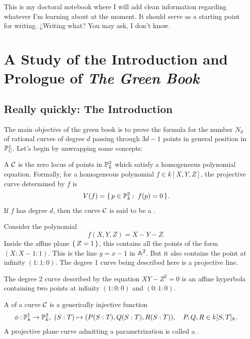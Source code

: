 \documentclass[12pt]{memoir}
\author{\nauthor}
\begin{document}
{\small 
\setlength{\parindent}{0em}
\setlength{\parskip}{1em}

This is my doctoral notebook where I will add clean information regarding whatever I'm learning about at the moment. It should serve as a starting point for writing. ¿Writing what? You may ask, I don't know.
}
\newpage
\tableofcontents
\chapter{A Study of the Introduction and Prologue of \emph{The Green Book}}

\section{Really quickly: The Introduction}

The main objective of the green book is to prove the formula for the number $N_d$ of rational curves of degree $d$ passing through $3d-1$ points in general position in $\mathbb{P}_{\mathbb{C}}^1$. Let's begin by unwrapping some concepts:

\begin{Def}
A  $\mathcal{C}$ is the zero locus of points in $\mathbb{P}^2_k$ which satisfy a homogeneous polynomial equation. Formally, for a homogeneous polynomial $f\in k[X,Y,Z]$, the projective curve determined by $f$ is
$$V(f)=\set{p\in\bP^2_k\:\ f(p)=0}.$$
If $f$ has degree $d$, then the curve $\mathcal{C}$ is said to be a .
\end{Def}

\begin{Ex}
Consider the polynomial 
$$f(X,Y,Z)=X-Y-Z.$$
Inside the affine plane $\{\,Z=1\,\}$, this contains all the points of the form $(X:X-1:1)$. This is the line $y=x-1$ in $\mathbb{A}^2$. But it also contains the point at infinity $(1:1:0)$. The degree 1 curve being described here is a projective line.
\end{Ex}

\begin{Ex}
    The degree 2 curve described by the equation $XY-Z^2=0$ is an affine hyperbola containing two points at infinity $(1:0:0)$ and $(0:1:0)$. 
\end{Ex}

\begin{Def}
A  of a curve $\mathcal{C}$ is a generically injective function $$\phi\:\bP^1_k\to\bP^2_k,\ (S:T)\mapsto(P(S:T),Q(S:T),R(S:T)),\quad P,Q,R\in k[S,T]_h.$$
A projective plane curve admitting a parametrization is called a .
\end{Def}
\end{document}
